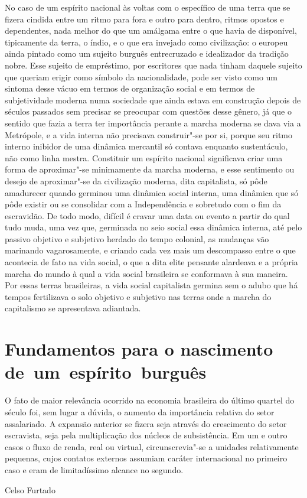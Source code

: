 No caso de um espírito nacional às voltas com o específico de uma terra
que se fizera cindida entre um ritmo para fora e outro para dentro,
ritmos opostos e dependentes, nada melhor do que um amálgama entre o que
havia de disponível, tipicamente da terra, o índio, e o que era invejado
como civilização: o europeu ainda pintado como um sujeito burguês
entrecruzado e idealizador da tradição nobre. Esse sujeito de
empréstimo, por escritores que nada tinham daquele sujeito que queriam
erigir como símbolo da nacionalidade, pode ser visto como um sintoma
desse vácuo em termos de organização social e em termos de subjetividade
moderna numa sociedade que ainda estava em construção depois de séculos
passados sem precisar se preocupar com questões desse gênero, já que o
sentido que fazia a terra ter importância perante a marcha moderna se
dava via a Metrópole, e a vida interna não precisava construir"-se por
si, porque seu ritmo interno inibidor de uma dinâmica mercantil só
contava enquanto sustentáculo, não como linha mestra. Constituir um
espírito nacional significava criar uma forma de aproximar"-se
minimamente da marcha moderna, e esse sentimento ou desejo de
aproximar"-se da civilização moderna, dita capitalista, só pôde
amadurecer quando germinou uma dinâmica social interna, uma dinâmica que
só pôde existir ou se consolidar com a Independência e sobretudo com o
fim da escravidão. De todo modo, difícil é cravar uma data ou evento a
partir do qual tudo muda, uma vez que, germinada no seio social essa
dinâmica interna, até pelo passivo objetivo e subjetivo herdado do tempo
colonial, as mudanças vão marinando vagarosamente, e criando cada vez
mais um descompasso entre o que acontecia de fato na vida social, o que
a dita elite pensante alardeava e a própria marcha do mundo à qual a
vida social brasileira se conformava à sua maneira. Por essas terras
brasileiras, a vida social capitalista germina sem o adubo que há tempos
fertilizava o solo objetivo e subjetivo nas terras onde a marcha do
capitalismo se apresentava adiantada.

\section{Fundamentos para o nascimento de~um~espírito~burguês}

\epigraph{O fato de maior relevância ocorrido na economia brasileira do último
quartel do século  foi, sem lugar a dúvida, o aumento da importância
relativa do setor assalariado. A expansão anterior se fizera seja
através do crescimento do setor escravista, seja pela multiplicação dos
núcleos de subsistência. Em um e outro casos o fluxo de renda, real ou
virtual, circunscrevia"-se a unidades relativamente pequenas, cujos
contatos externos assumiam caráter internacional no primeiro caso e eram
de limitadíssimo alcance no segundo.}{Celso Furtado}



